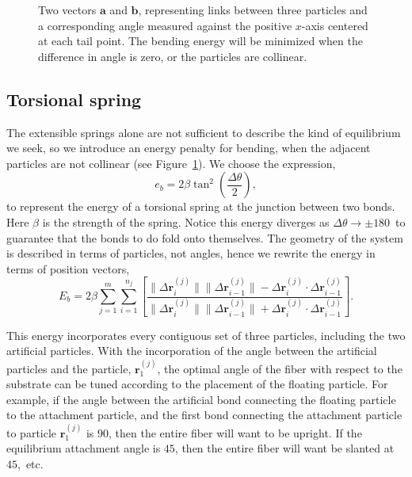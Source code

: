	\begin{figure}[t]
		\begin{center}
			
		\end{center}		
		\caption{Two vectors $\textbf{a}$ and $\textbf{b}$, representing links between three particles and a corresponding angle measured against the positive $x$-axis centered at each tail point. The bending energy will be minimized when the difference in angle is zero, or the particles are collinear.
		\label{fig:BendingEnergy}}
	\end{figure}	

\subsection{Torsional spring}

The extensible springs alone are not sufficient to describe the kind of equilibrium we seek, so we introduce an energy penalty for bending, when the adjacent particles are not collinear (see Figure~\ref{fig:BendingEnergy}). We choose the expression,
\begin{equation}
	e_b = 2\beta \tan^2 \left( \frac{\Delta \theta}{2} \right),
\end{equation}
to represent the energy of a torsional spring at the junction between two bonds. Here $\beta$ is the strength of the spring. Notice this energy diverges as $\Delta \theta \to \pm180$\textdegree\ to guarantee that the bonds to do fold onto themselves. The geometry of the system is described in terms of particles, not angles, hence we rewrite the energy in terms of position vectors,
\begin{equation}
	E_b = 2\beta \sum_{j=1}^m \sum_{i=1}^{n_j} \left[ \frac{\|\Delta \textbf{r}_i^{(j)} \| \|\Delta \textbf{r}_{i-1}^{(j)} \| - \Delta \textbf{r}_i^{(j)} \cdot \Delta \textbf{r}_{i-1}^{(j)}}{\|\Delta \textbf{r}_i^{(j)} \| \|\Delta \textbf{r}_{i-1}^{(j)} \| + \Delta \textbf{r}_i^{(j)} \cdot \Delta \textbf{r}_{i-1}^{(j)}} \right].
\end{equation}

This energy incorporates every contiguous set of three particles, including the two artificial particles. With the incorporation of the angle between the artificial particles and the particle, $\textbf{r}_1^{(j)}$, the optimal angle of the fiber with respect to the substrate can be tuned according to the placement of the floating particle. For example, if the angle between the artificial bond connecting the floating particle to the attachment particle, and the first bond connecting the attachment particle to particle $\textbf{r}_1^{(j)}$ is $90$\textdegree, then the entire fiber will want to be upright. If the equilibrium attachment angle is $45$\textdegree, then the entire fiber will want be slanted at $45$\textdegree,~etc. 


